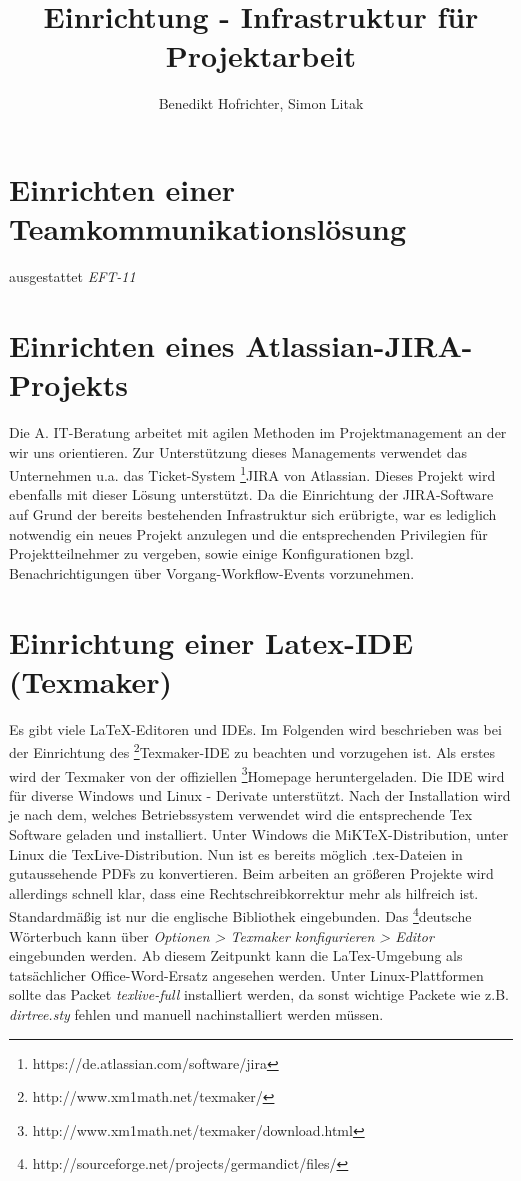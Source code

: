 \documentclass{article}
\begin{document}
\title{Einrichtung - Infrastruktur für Projektarbeit}
\author{Benedikt Hofrichter, Simon Litak}
\maketitle

\section{Einrichten einer Teamkommunikationslösung}
ausgestattet
\emph{EFT-11}

\section{Einrichten eines Atlassian-JIRA-Projekts}
Die A. IT-Beratung arbeitet mit agilen Methoden im Projektmanagement an der wir uns orientieren. Zur Unterstützung dieses Managements verwendet das Unternehmen u.a. das Ticket-System \footnote{\label{foot:1}https://de.atlassian.com/software/jira}JIRA von Atlassian. Dieses Projekt wird ebenfalls mit dieser Lösung unterstützt. Da die Einrichtung der JIRA-Software auf Grund der bereits bestehenden Infrastruktur sich erübrigte, war es lediglich notwendig ein neues Projekt anzulegen und die entsprechenden Privilegien für Projektteilnehmer zu vergeben, sowie einige Konfigurationen bzgl. Benachrichtigungen über Vorgang-Workflow-Events vorzunehmen. 

\section{Einrichtung einer Latex-IDE (Texmaker)}
Es gibt viele LaTeX-Editoren und IDEs. Im Folgenden wird beschrieben was bei der Einrichtung des \footnote{\label{foot:2}http://www.xm1math.net/texmaker/}Texmaker-IDE zu beachten und vorzugehen ist. Als erstes wird der Texmaker von der offiziellen \footnote{\label{foot:3}http://www.xm1math.net/texmaker/download.html}Homepage heruntergeladen. Die IDE wird für diverse Windows und Linux - Derivate unterstützt. Nach der Installation wird je nach dem, welches Betriebssystem verwendet wird die entsprechende Tex Software geladen und installiert. Unter Windows die MiKTeX-Distribution, unter Linux die TexLive-Distribution. 
Nun ist es bereits möglich .tex-Dateien in gutaussehende PDFs zu konvertieren. Beim arbeiten an größeren Projekte wird allerdings schnell klar, dass eine Rechtschreibkorrektur mehr als hilfreich ist. Standardmäßig ist nur die englische Bibliothek eingebunden. Das \footnote{\label{foot:4}http://sourceforge.net/projects/germandict/files/}deutsche Wörterbuch kann über \emph{Optionen > Texmaker konfigurieren > Editor} eingebunden werden. Ab diesem Zeitpunkt kann die LaTex-Umgebung als tatsächlicher Office-Word-Ersatz angesehen werden. 
Unter Linux-Plattformen sollte das Packet \emph{texlive-full} installiert werden, da sonst wichtige Packete wie z.B. \emph{dirtree.sty} fehlen und manuell nachinstalliert werden müssen. 
\end{document}

